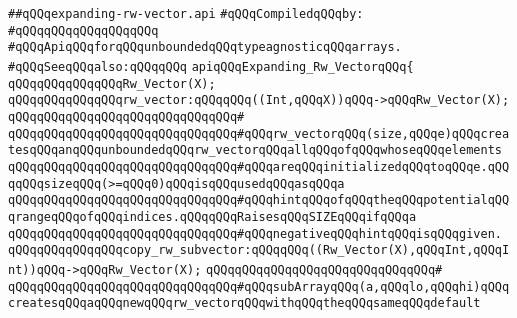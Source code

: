\label{src/lib/src/expanding-rw-vector.api}
\verb|##qQQqexpanding-rw-vector.api|\newline
\newline
\verb|#qQQqCompiledqQQqby:|\newline
\verb|#qQQqqQQqqQQqqQQqqQQq|\newline
\newline
\newline
\newline
\verb|#qQQqApiqQQqforqQQqunboundedqQQqtypeagnosticqQQqarrays.|\newline
\verb|#qQQqSeeqQQqalso:qQQqqQQq|\newline
\newline
\verb|apiqQQqExpanding_Rw_VectorqQQq{|\newline
\newline
\verb|qQQqqQQqqQQqqQQqRw_Vector(X);|\newline
\newline
\newline
\newline
\verb|qQQqqQQqqQQqqQQqrw_vector:qQQqqQQq((Int,qQQqX))qQQq->qQQqRw_Vector(X);|\newline
\verb|qQQqqQQqqQQqqQQqqQQqqQQqqQQqqQQq#|\newline
\verb|qQQqqQQqqQQqqQQqqQQqqQQqqQQqqQQq#qQQqrw_vectorqQQq(size,qQQqe)qQQqcreatesqQQqanqQQqunboundedqQQqrw_vectorqQQqallqQQqofqQQqwhoseqQQqelements|\newline
\verb|qQQqqQQqqQQqqQQqqQQqqQQqqQQqqQQq#qQQqareqQQqinitializedqQQqtoqQQqe.qQQqqQQqsizeqQQq(>=qQQq0)qQQqisqQQqusedqQQqasqQQqa|\newline
\verb|qQQqqQQqqQQqqQQqqQQqqQQqqQQqqQQq#qQQqhintqQQqofqQQqtheqQQqpotentialqQQqrangeqQQqofqQQqindices.qQQqqQQqRaisesqQQqSIZEqQQqifqQQqa|\newline
\verb|qQQqqQQqqQQqqQQqqQQqqQQqqQQqqQQq#qQQqnegativeqQQqhintqQQqisqQQqgiven.|\newline
\newline
\newline
\newline
\verb|qQQqqQQqqQQqqQQqcopy_rw_subvector:qQQqqQQq((Rw_Vector(X),qQQqInt,qQQqInt))qQQq->qQQqRw_Vector(X);|\newline
\verb|qQQqqQQqqQQqqQQqqQQqqQQqqQQqqQQq#|\newline
\verb|qQQqqQQqqQQqqQQqqQQqqQQqqQQqqQQq#qQQqsubArrayqQQq(a,qQQqlo,qQQqhi)qQQqcreatesqQQqaqQQqnewqQQqrw_vectorqQQqwithqQQqtheqQQqsameqQQqdefault|\newline
